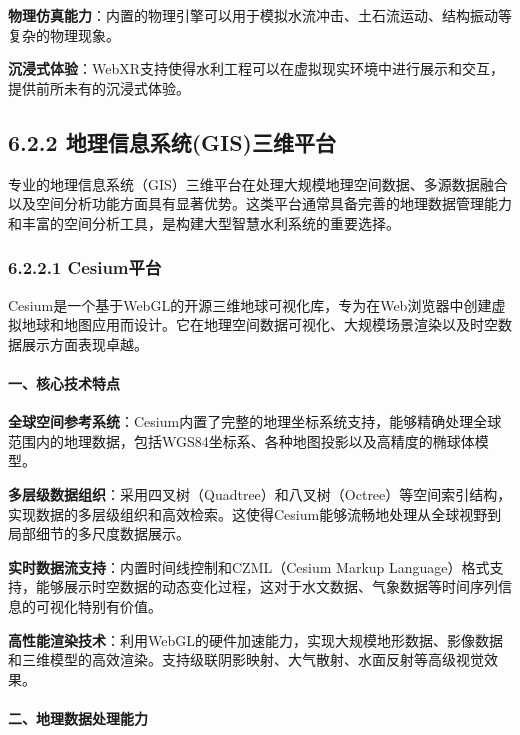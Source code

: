 \textbf{物理仿真能力}：内置的物理引擎可以用于模拟水流冲击、土石流运动、结构振动等复杂的物理现象。

\textbf{沉浸式体验}：WebXR支持使得水利工程可以在虚拟现实环境中进行展示和交互，提供前所未有的沉浸式体验。

\subsection{6.2.2
地理信息系统(GIS)三维平台}\label{ux5730ux7406ux4fe1ux606fux7cfbux7edfgisux4e09ux7ef4ux5e73ux53f0}

专业的地理信息系统（GIS）三维平台在处理大规模地理空间数据、多源数据融合以及空间分析功能方面具有显著优势。这类平台通常具备完善的地理数据管理能力和丰富的空间分析工具，是构建大型智慧水利系统的重要选择。

\subsubsection{6.2.2.1 Cesium平台}\label{cesiumux5e73ux53f0}

Cesium是一个基于WebGL的开源三维地球可视化库，专为在Web浏览器中创建虚拟地球和地图应用而设计。它在地理空间数据可视化、大规模场景渲染以及时空数据展示方面表现卓越。

\paragraph{一、核心技术特点}\label{ux4e00ux6838ux5fc3ux6280ux672fux7279ux70b9}

\textbf{全球空间参考系统}：Cesium内置了完整的地理坐标系统支持，能够精确处理全球范围内的地理数据，包括WGS84坐标系、各种地图投影以及高精度的椭球体模型。

\textbf{多层级数据组织}：采用四叉树（Quadtree）和八叉树（Octree）等空间索引结构，实现数据的多层级组织和高效检索。这使得Cesium能够流畅地处理从全球视野到局部细节的多尺度数据展示。

\textbf{实时数据流支持}：内置时间线控制和CZML（Cesium Markup
Language）格式支持，能够展示时空数据的动态变化过程，这对于水文数据、气象数据等时间序列信息的可视化特别有价值。

\textbf{高性能渲染技术}：利用WebGL的硬件加速能力，实现大规模地形数据、影像数据和三维模型的高效渲染。支持级联阴影映射、大气散射、水面反射等高级视觉效果。

\paragraph{二、地理数据处理能力}\label{ux4e8cux5730ux7406ux6570ux636eux5904ux7406ux80fdux529b}

